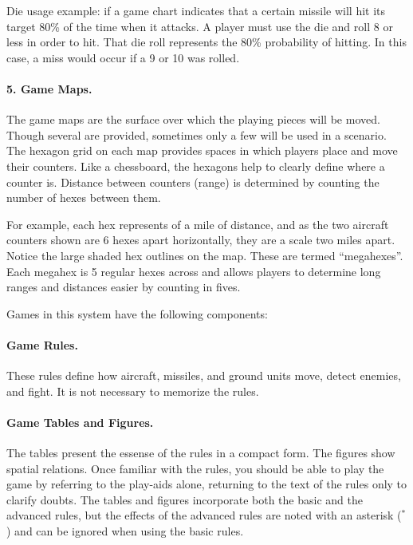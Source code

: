 {Die usage example: if a game chart indicates that a certain missile will hit its target 80\% of the time when it attacks. A player must use the die and roll 8 or less in order to hit. That die roll represents the 80\% probability of hitting. In this case, a miss would occur if a 9 or 10 was rolled.

\paragraph{5. Game Maps.} The game maps are the surface over which the playing pieces will be moved. Though several are provided, sometimes only a few will be used in a scenario. The hexagon grid on each map provides spaces in which players place and move their counters. Like a chessboard, the hexagons help to clearly define where a counter is. Distance between counters (range) is determined by counting the number of hexes between them. 

For example,  each hex represents {\onethird} of a mile of distance, and as the two aircraft counters shown are 6 hexes apart horizontally, they are a scale two miles apart. 
Notice the large shaded hex outlines on the map. These are termed “megahexes”. Each megahex is 5 regular hexes across and allows players to determine long ranges and distances easier by counting in fives. 

}{

Games in this system have the following components:

\paragraph{Game Rules.} These rules define how aircraft, missiles, and ground units move, detect enemies, and fight. It is not necessary to memorize the rules. 

\paragraph{Game Tables and Figures.} The tables present the essense of the rules in a compact form. The figures show spatial relations. Once familiar with the rules, you should be able to play the game by referring to the play-aids alone, returning to the text of the rules only to clarify doubts. The tables and figures incorporate both the basic and the advanced rules, but the effects of the advanced rules are noted with an asterisk ($^*$) and can be ignored when using the basic rules.

}
